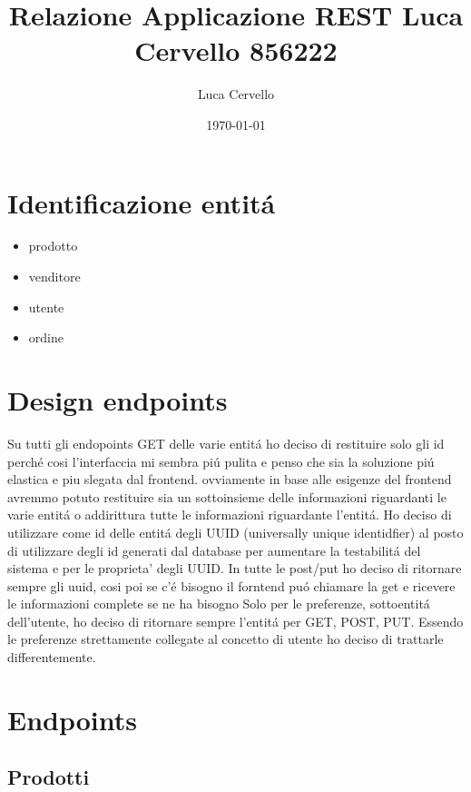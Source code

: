 \documentclass[11pt]{article}
\author{Luca Cervello}
\date{\today}
\title{Relazione Applicazione REST Luca Cervello 856222}
\begin{document}
\maketitle
\tableofcontents


\section{Identificazione entitá}
\label{sec:org56c52da}
\begin{itemize}
\item prodotto
\item venditore
\item utente
\item ordine
\end{itemize}
\section{Design endpoints}
\label{sec:orgfff8088}
Su tutti gli endopoints GET delle varie entitá ho deciso di restituire solo gli id perché cosi l'interfaccia 
mi sembra piú pulita e penso che sia la soluzione piú elastica e piu slegata dal frontend.
ovviamente in base alle esigenze del frontend avremmo potuto restituire sia un sottoinsieme delle informazioni
riguardanti le varie entitá o addirittura tutte le informazioni riguardante l'entitá.
Ho deciso di utilizzare come id delle entitá degli UUID (universally unique identidfier) al posto di utilizzare 
degli id generati dal database per aumentare la testabilitá del sistema e per le proprieta' degli UUID.
In tutte le post/put ho deciso di ritornare sempre gli uuid, cosi poi se c'é bisogno il forntend puó chiamare
la get e ricevere le informazioni complete se ne ha bisogno
Solo per le preferenze, sottoentitá dell'utente, ho deciso di ritornare sempre l'entitá per GET, POST, PUT.
Essendo le preferenze strettamente collegate al concetto di utente ho deciso di trattarle differentemente.
\section{Endpoints}
\label{sec:org2ce0bcc}
\subsection{Prodotti}
\label{sec:org9e04b14}
\end{document}
